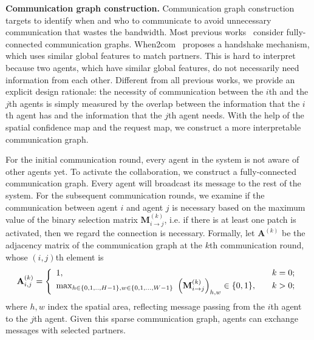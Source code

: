 \documentclass{article}
\begin{document}
\textbf{Communication graph construction.} Communication graph construction targets to identify when and who to communicate to avoid unnecessary communication that wastes the bandwidth. Most previous works~\cite{v2vnet,disconet,OPV2V} consider fully-connected communication graphs. When2com~\cite{when2com} proposes a handshake mechanism, which uses similar global features to match partners. This is hard to interpret because two agents, which have similar global features, do not necessarily need information from each other. Different from all previous works, we provide an explicit design rationale: the necessity of communication between the $i$th and the $j$th agents is simply measured by the overlap between the information that the $i$th agent has and the information that the $j$th agent needs. With the help of the spatial confidence map and the request map, we construct a more interpretable communication graph.

For the initial communication round, every agent in the system is not aware of other agents yet. To activate the collaboration, we construct a fully-connected communication graph. Every agent will broadcast its message to the rest of the system. For the subsequent communication rounds, we examine if the communication between agent $i$ and agent $j$ is necessary based on the maximum value of the binary selection matrix $\mathbf{M}_{i\rightarrow j}^{(k)}$, i.e. if there is at least one patch is activated, then we regard the connection is necessary. Formally, let $\mathbf{A}^{(k)}$ be the adjacency matrix of the communication graph at the $k$th communication round, whose $(i,j)$th element is \vspace{-1mm}
\begin{equation*}
 \mathbf{A}_{i,j}^{(k)}=\left\{
\begin{array}{lll}
1, &\quad k=0; \\
{\rm max}_{h \in \{0,1,..,H-1\},w \in \{0,1,...,W-1\}}~ \left( \mathbf{M}_{i\rightarrow j}^{(k)} \right)_{h,w} \in \{0, 1\}, &\quad k>0;
\end{array} \right.
\end{equation*}
where $h, w$ index the spatial area, reflecting message passing from the $i$th agent to the $j$th agent.  Given this sparse communication graph, agents can exchange messages with selected partners.



\vspace{-2mm}
\end{document}
